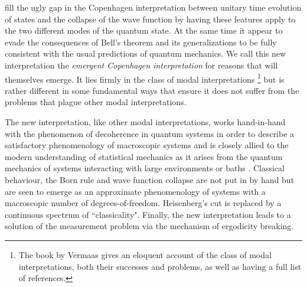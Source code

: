 \documentclass[%
preprint,
nofootinbib,
 amsmath,amssymb,
aps,
]{revtex4-1}
\begin{document}
fill the ugly gap in the Copenhagen interpretation between unitary time evolution of states and the collapse of the wave function by having these features apply to the two different modes of the quantum state.
At the same time it appear to evade the consequences of Bell's theorem and its generalizations to be fully consistent with the usual predictions of quantum mechanics.
We call this new interpretation the {\it emergent Copenhagen interpretation\/} for reasons that will themselves emerge. It lies firmly in the class of modal interpretations \cite{Krips:1969tpqm,Krips:1975siqt,Krips:1987mqt,vanFraassen:1972faps,Cartwright:1974vfmmqm,Krips:1987mqt,vanFraassen:1991qmmv,Bub:1992qmwpp,VermaasDieks:1995miqmgdo,BacciagaluppiDickson:1999dmi}\footnote{The book by Vermaas \cite{Vermaas:1999puqm} gives an eloquent account of the class of modal interpretations, both their successes and problems, as well as having a full list of references.} but is rather different in some fundamental ways that ensure it does not suffer from the problems that plague other modal interpretations.

The new interpretation, like other modal interpretations, works hand-in-hand with the phenomenon of decoherence in quantum systems \cite{Bohm:1951qt,JoosZeh:1985ecptiwe,Joos:2003dacwqt,Zurek:2003dtqc,Schlosshauer:2005dmpiqm,SchlosshauerCamilleri:2008qct,BreuerPetruccione:2002toqs} in order to describe a satisfactory phenomenology of macroscopic systems and is closely allied to the modern understanding of statistical mechanics as it arises from the quantum mechanics of systems interacting with large environments or baths \cite{PopescuShortWinter:2005fsmeisa,PopescuShortWinter:2006efsm,BL,LL,GoldsteinLebowitzTumulkaZanghi:2006ct,GMM,LPSW,Sh}. Classical behaviour, the Born rule and wave function collapse are not put in by hand but are seen to emerge as an approximate phenomenology of systems with a macroscopic number of degrees-of-freedom. Heisenberg's cut is replaced by a continuous spectrum of ``classicality".
Finally, the new interpretation  leads to a solution of the measurement problem via the mechanism of ergodicity breaking.
\end{document}
